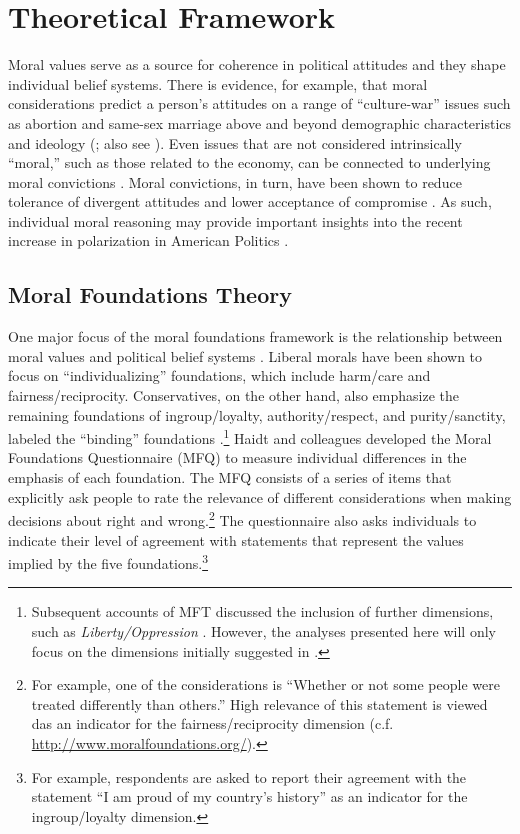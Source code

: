 \documentclass[12pt]{article}
\begin{document}
\section{Theoretical Framework}

Moral values serve as a source for coherence in political attitudes and they shape individual belief systems. There is evidence, for example, that moral considerations predict a person's attitudes on a range of ``culture-war'' issues such as abortion and same-sex marriage above and beyond demographic characteristics and ideology (\citealt{koleva2012tracing}; also see \citealt{clifford2015concerns}). Even issues that are not considered intrinsically ``moral,'' such as those related to the economy, can be connected to underlying moral convictions \citep{ryan2014reconsidering}. Moral convictions, in turn, have been shown to reduce tolerance of divergent attitudes and lower acceptance of compromise \citep[][]{skitka2010psychology,ryan2016no}. As such, individual moral reasoning may provide important insights into the recent increase in polarization in American Politics \citep{iyengar2015fear}.


\subsection{Moral Foundations Theory}

One major focus of the moral foundations framework is the relationship between moral values and political belief systems \citep[c.f.][]{haidt2012righteous}. Liberal morals have been shown to focus on ``individualizing'' foundations, which include harm/care and fairness/reciprocity. Conservatives, on the other hand, also emphasize the remaining foundations of ingroup/loyalty, authority/respect, and purity/sanctity, labeled the ``binding'' foundations \citep{haidt2007morality,graham2009liberals}.\footnote{Subsequent accounts of MFT discussed the inclusion of further dimensions, such as \textit{Liberty/Oppression} \citep[c.f.][]{graham2013moral,haidt2012righteous}. However, the analyses presented here will only focus on the dimensions initially suggested in \citet{haidt2008moral}.} Haidt and colleagues developed the Moral Foundations Questionnaire (MFQ) to measure individual differences in the emphasis of each foundation. The MFQ consists of a series of items that explicitly ask people to rate the relevance of different considerations when making decisions about right and wrong.\footnote{For example, one of the considerations is ``Whether or not some people were treated differently than others.'' High relevance of this statement is viewed das an indicator for the fairness/reciprocity dimension (c.f. \url{http://www.moralfoundations.org/}).} The questionnaire also asks individuals to indicate their level of agreement with statements that represent the values implied by the five foundations.\footnote{For example, respondents are asked to report their agreement with the statement ``I am proud of my country's history'' as an indicator for the ingroup/loyalty dimension.}
\end{document}
